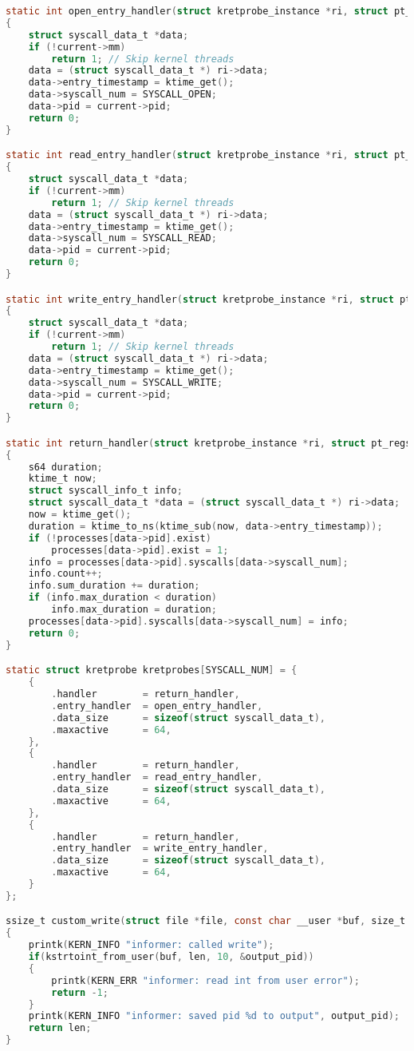 \begin{appendices}
\begin{lstlisting}[language=C, label=lst:full_code, caption={Код модуля ядра для мониторинга системных вызовов open, read, close}]
static int open_entry_handler(struct kretprobe_instance *ri, struct pt_regs *regs)
{
    struct syscall_data_t *data;
    if (!current->mm)
        return 1; // Skip kernel threads
    data = (struct syscall_data_t *) ri->data;
    data->entry_timestamp = ktime_get();
    data->syscall_num = SYSCALL_OPEN;
    data->pid = current->pid;
    return 0;
}

static int read_entry_handler(struct kretprobe_instance *ri, struct pt_regs *regs)
{
    struct syscall_data_t *data;
    if (!current->mm)
        return 1; // Skip kernel threads
    data = (struct syscall_data_t *) ri->data;
    data->entry_timestamp = ktime_get();
    data->syscall_num = SYSCALL_READ;
    data->pid = current->pid;
    return 0;
}

static int write_entry_handler(struct kretprobe_instance *ri, struct pt_regs *regs)
{
    struct syscall_data_t *data;
    if (!current->mm)
        return 1; // Skip kernel threads
    data = (struct syscall_data_t *) ri->data;
    data->entry_timestamp = ktime_get();
    data->syscall_num = SYSCALL_WRITE;
    data->pid = current->pid;
    return 0;
}

static int return_handler(struct kretprobe_instance *ri, struct pt_regs *regs)
{
    s64 duration;
    ktime_t now;
    struct syscall_info_t info;
    struct syscall_data_t *data = (struct syscall_data_t *) ri->data;
    now = ktime_get();
    duration = ktime_to_ns(ktime_sub(now, data->entry_timestamp));
    if (!processes[data->pid].exist)
        processes[data->pid].exist = 1;
    info = processes[data->pid].syscalls[data->syscall_num];
    info.count++;
    info.sum_duration += duration;
    if (info.max_duration < duration)
        info.max_duration = duration;
    processes[data->pid].syscalls[data->syscall_num] = info;
    return 0;
}

static struct kretprobe kretprobes[SYSCALL_NUM] = {
    {
        .handler		= return_handler,
        .entry_handler	= open_entry_handler,
        .data_size		= sizeof(struct syscall_data_t),
        .maxactive		= 64,
    },
    {
        .handler		= return_handler,
        .entry_handler	= read_entry_handler,
        .data_size		= sizeof(struct syscall_data_t),
        .maxactive		= 64,
    },
    {
        .handler		= return_handler,
        .entry_handler	= write_entry_handler,
        .data_size		= sizeof(struct syscall_data_t),
        .maxactive		= 64,
    }
};

ssize_t custom_write(struct file *file, const char __user *buf, size_t len, loff_t *offp)
{
    printk(KERN_INFO "informer: called write");
    if(kstrtoint_from_user(buf, len, 10, &output_pid))
    {
        printk(KERN_ERR "informer: read int from user error");
        return -1;
    }
    printk(KERN_INFO "informer: saved pid %d to output", output_pid);
    return len;
}


\end{lstlisting}
\end{appendices}
